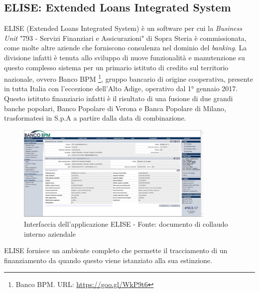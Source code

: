 
\subsection{ELISE: Extended Loans Integrated System}

	ELISE (Extended Loans Integrated System) è un software per cui la \textit{Business Unit} "793 - Servizi Finanziari e Assicurazioni" di Sopra Steria è commissionata, come molte altre aziende che forniscono consulenza nel dominio del \textit{banking}. La divisione infatti è tenuta allo sviluppo di nuove funzionalità e manutenzione su questo complesso sistema per un primario istituto di credito sul territorio nazionale, ovvero Banco BPM \footnote{Banco BPM. URL: \url{https://goo.gl/WkP9t6}}, gruppo bancario di origine cooperativa, presente in tutta Italia con l'eccezione dell'Alto Adige, operativo dal \ang{1} gennaio 2017. Questo istituto finanziario infatti è il risultato di una fusione di due grandi banche popolari, Banco Popolare di Verona e Banca Popolare di Milano, trasformatesi in S.p.A a partire dalla data di combinazione.\\

	\begin{figure}[H]
		\centering
	   	\includegraphics[width=0.85\textwidth]{immagini/Elise}
	   	\caption{Interfaccia dell'applicazione ELISE - Fonte: documento di collaudo interno aziendale}
	\end{figure}

	ELISE fornisce un ambiente completo che permette il tracciamento di un finanziamento da quando questo viene istanziato alla sua estinzione.\\
	
